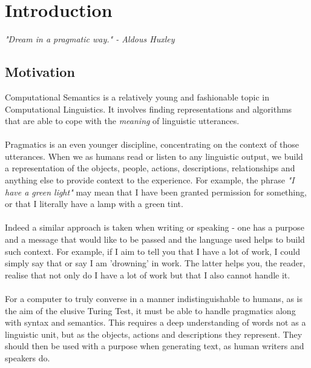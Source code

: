 \chapter{Introduction}
\ifpdf
    \graphicspath{{Introduction/IntroductionFigs/PNG/}{Introduction/IntroductionFigs/PDF/}{Introduction/IntroductionFigs/}}
\else
    \graphicspath{{Introduction/IntroductionFigs/EPS/}{Introduction/IntroductionFigs/}}
\fi
\emph{"Dream in a pragmatic way." - Aldous Huxley}

\section{Motivation}

Computational Semantics is a relatively young and fashionable topic in Computational Linguistics. It involves finding representations and algorithms that are able to cope with the \textit{meaning} of linguistic utterances.
\\\\
Pragmatics is an even younger discipline, concentrating on the context of those utterances. When we as humans read or listen to any linguistic output, we build a representation of the objects, people, actions, descriptions, relationships and anything else to provide context to the experience. For example, the phrase \textit{"I have a green light"} may mean that I have been granted permission for something, or that I literally have a lamp with a green tint. 
\\\\
Indeed a similar approach is taken when writing or speaking - one has a purpose and a message that would like to be passed and the language used helps to build such context. For example, if I aim to tell you that I have a lot of work, I could simply say that or say I am 'drowning' in work. The latter helps you, the reader, realise that not only do I have a lot of work but that I also cannot handle it.
\\\\
For a computer to truly converse in a manner indistinguishable to humans, as is the aim of the elusive Turing Test, it must be able to handle pragmatics along with syntax and semantics. This requires a deep understanding of words not as a linguistic unit, but as the objects, actions and descriptions they represent. They should then be used with a purpose when generating text, as human writers and speakers do.
\\\\
